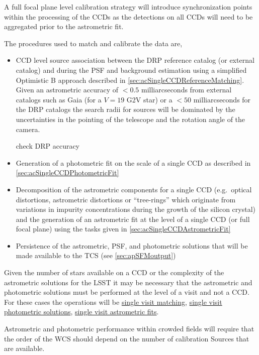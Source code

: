 A full focal plane level calibration strategy will introduce synchronization points within the processing of the CCDs as the detections on all CCDs will need to be aggregated prior to the astrometric fit.

The procedures used to match and calibrate the data are,
\begin{itemize}
\item CCD level source association between the DRP reference catalog (or external catalog) and \Sources  during the PSF and background estimation using a simplified Optimistic B approach described in \ref{sec:acSingleCCDReferenceMatching}. Given an astrometric accuracy of $<0.5$ milliarcseconds from external catalogs such as Gaia (for a $V=19$ G2V star) or a $<50$ milliarcseconds for the DRP catalogs the search radii for sources will be dominated by the uncertainties in the pointing of the telescope and the rotation angle of the camera.
\begin{note} check DRP accuracy \end{note}
\item Generation of a photometric fit on the scale of a single CCD as described in \ref{sec:acSingleCCDPhotometricFit}
\item Decomposition of the astrometric components for a single CCD (e.g.\ optical distortions, astrometric distortions or ``tree-rings'' which originate from variations in impurity concentrations during the growth of the silicon crystal) and the generation of  an astrometric fit at the level of a single CCD (or full focal plane) using the tasks given in \ref{sec:acSingleCCDAstrometricFit}
\item Persistence of the astrometric, PSF, and photometric solutions that will be made available to the TCS (see \ref{sec:apSFMoutput})
\end{itemize}

Given the number of stars available on a CCD or the complexity of the astrometric solutions for the LSST it may be necessary that the astrometric and photometric solutions must be performed at the level of a visit and not a CCD.  For these cases the operations will be \hyperref[sec:acSingleVisitReferenceMatching]{single visit matching},   \hyperref[sec:acSingleCCDPhotometricFit]{single visit photometric solutions}, \hyperref[sec:acSingleVisitAstrometricFit]{single visit astrometric fits}.

Astrometric and photometric performance within crowded fields will require that the order of the WCS should depend on the number of calibration Sources that are available.

